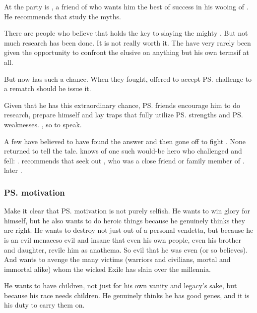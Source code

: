 At the party is , a friend of \Teshrial{} who wants him the best of success in his wooing of \Firaxel. 
He recommends that \Teshrial{} study the myths. 

There are people who believe that \WanderersInDarknessEmph holds the key to slaying the mighty \dragonlord. 
But not much research has been done. 
It is not really worth it. 
The have \resphain{} very rarely been given the opportunity to confront the elusive \Ishnaruchaefir{} on anything but his own terms\dash if at all. 

But \Teshrial{} now has such a chance. 
When they fought, \Ishnaruchaefir{} {offered to accept \ps{\Teshrial} challenge to a rematch} should he issue it. 

Given that he has this extraordinary chance, \ps{\Teshrial} friends encourage him to do research, prepare himself and lay traps that fully utilize \ps{\Teshrial} strengths and \ps{\Ishnaruchaefir} weaknesses. 
, so to speak. 

A few have believed to have found the answer and then gone off to fight \Ishnaruchaefir{}. 
None returned to tell the tale. 
\Menessiaraid{} knows of one such would-be hero who challenged \Ishnaruchaefir{} and fell: 
. 
\Menessiaraid{} recommends that \Teshrial{} seek out , who was a close friend or family member of \Lothagiel. 
\Teshrial{} later . 





\subsubsection{\ps{\Teshrial} motivation}
Make it clear that \ps{\Teshrial} motivation is not purely selfish. 
He wants to win glory for himself, but he also wants to do heroic things because he genuinely thinks they are right. 
He wants to destroy \Ishnaruchaefir{} not just out of a personal vendetta, but because he is an evil menace\dash so evil and insane that even his own people, even his brother and daughter, revile him as anathema. 
So evil that he was even  (or so \Teshrial{} believes). 
And \Teshrial{} wants to avenge the many victims (warriors and civilians, mortal and immortal alike) whom the wicked Exile has slain over the millennia. 

He wants to have children, not just for his own vanity and legacy's sake, but because his race needs children. 
He genuinely thinks he has good genes, and it is his duty to carry them on. 





